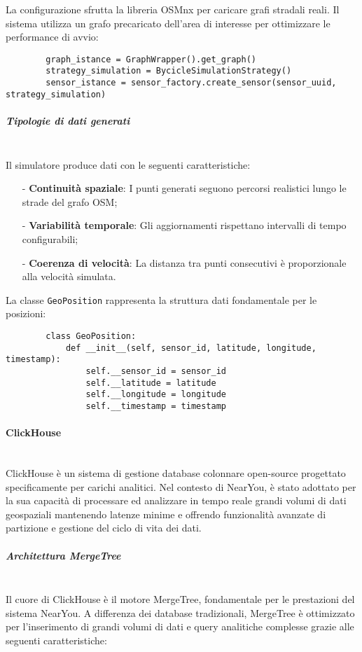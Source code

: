 \documentclass[10pt]{article}
\newcommand{\myparagraph}[1]{\paragraph{#1}\mbox{}\\}
\newcommand{\mysubparagraph}[1]{\subparagraph{#1}\mbox{}\\}
\begin{document}
        La configurazione sfrutta la libreria OSMnx per caricare grafi stradali reali. Il sistema utilizza un grafo precaricato dell'area di interesse per ottimizzare le performance di avvio:
        \begin{lstlisting}
        graph_istance = GraphWrapper().get_graph()
        strategy_simulation = BycicleSimulationStrategy()
        sensor_istance = sensor_factory.create_sensor(sensor_uuid, strategy_simulation)
        \end{lstlisting}
    
        \mysubparagraph{Tipologie di dati generati}
        Il simulatore produce dati con le seguenti caratteristiche:
        \begin{itemize}
            \item[-] \textbf{Continuità spaziale}: I punti generati seguono percorsi realistici lungo le strade del grafo OSM;
            \item[-] \textbf{Variabilità temporale}: Gli aggiornamenti rispettano intervalli di tempo configurabili;
            \item[-] \textbf{Coerenza di velocità}: La distanza tra punti consecutivi è proporzionale alla velocità simulata.
        \end{itemize}
    
        La classe \texttt{GeoPosition} rappresenta la struttura dati fondamentale per le posizioni:
        \begin{lstlisting}
        class GeoPosition:
            def __init__(self, sensor_id, latitude, longitude, timestamp):
                self.__sensor_id = sensor_id
                self.__latitude = latitude
                self.__longitude = longitude
                self.__timestamp = timestamp
        \end{lstlisting}
        \myparagraph{ClickHouse}
        ClickHouse è un sistema di gestione database colonnare open-source progettato specificamente per carichi analitici. Nel contesto di NearYou, è stato adottato per la sua capacità di processare ed analizzare in tempo reale grandi volumi di dati geospaziali mantenendo latenze minime e offrendo funzionalità avanzate di partizione e gestione del ciclo di vita dei dati.
        
        \mysubparagraph{Architettura MergeTree}
        Il cuore di ClickHouse è il motore MergeTree, fondamentale per le prestazioni del sistema NearYou. A differenza dei database tradizionali, MergeTree è ottimizzato per l'inserimento di grandi volumi di dati e query analitiche complesse grazie alle seguenti caratteristiche:
        
\end{document}
